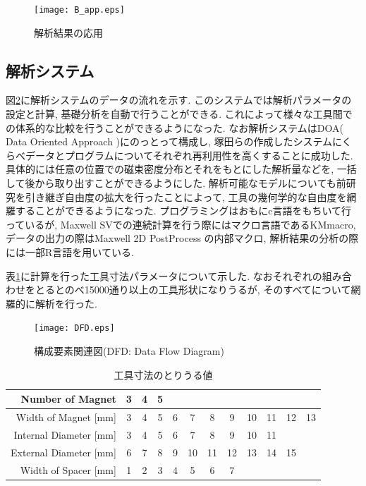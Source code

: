 \documentclass[11pt]{jarticle}
\begin{document}
  \begin{figure}[H]
    \begin{center}
      \texttt{[image: B\_app.eps]}
    \end{center}
    \caption{解析結果の応用}
    \label{fig:B_app}
  \end{figure}

  \subsection{解析システム}
図\ref{fig:DFD}に解析システムのデータの流れを示す. このシステムでは解析パラメータの設定と計算, 基礎分析を自動で行うことができる. これによって様々な工具間での体系的な比較を行うことができるようになった. なお解析システムはDOA( Data Oriented Approach )にのっとって構成し, 塚田らの作成したシステム\cite{塚田}にくらべデータとプログラムについてそれぞれ再利用性を高くすることに成功した. 具体的には任意の位置での磁束密度分布とそれをもとにした解析量などを, 一括して後から取り出すことができるようにした. 解析可能なモデルについても前研究を引き継ぎ自由度の拡大を行ったことによって, 工具の幾何学的な自由度を網羅することができるようになった. プログラミングはおもにc言語をもちいて行っているが, Maxwell SVでの連続計算を行う際にはマクロ言語であるKMmacro\cite{KMmacro}, データの出力の際はMaxwell 2D PostProcess の内部マクロ, 解析結果の分析の際には一部R言語\cite{RR}を用いている. \par
表\ref{tab:tool_par}に計算を行った工具寸法パラメータについて示した. なおそれぞれの組み合わせをとるとのべ15000通り以上の工具形状になりうるが, そのすべてについて網羅的に解析を行った. 

  \begin{figure}[H]
    \begin{center}
      \texttt{[image: DFD.eps]}
    \end{center}
    \caption{構成要素関連図(DFD: Data Flow Diagram)}
    \label{fig:DFD}
  \end{figure}

  \begin{table}[H]
    \begin{tabular}{|r||c|c|c|c|c|c|c|c|c|c|c|} \hline
        Number of Magnet & 3 & 4 & 5 & & & & & & & & \\ \hline 
        Width of Magnet [mm] & 3 & 4 & 5 & 6 & 7 & 8 & 9 & 10 & 11 & 12 & 13 \\ \hline
        Internal Diameter [mm] & 3 & 4 & 5 & 6 & 7 & 8 & 9 & 10 & 11 & & \\ \hline
        External Diameter [mm] & 6 & 7 & 8 & 9 & 10 & 11 & 12 & 13 & 14 & 15 &\\ \hline
        Width of Spacer [mm] & 1 & 2 & 3 & 4 & 5 & 6 & 7 & & & & \\ \hline
    \end{tabular}
    \centering
    \caption{工具寸法のとりうる値}
    \label{tab:tool_par}
  \end{table}
\end{document}
